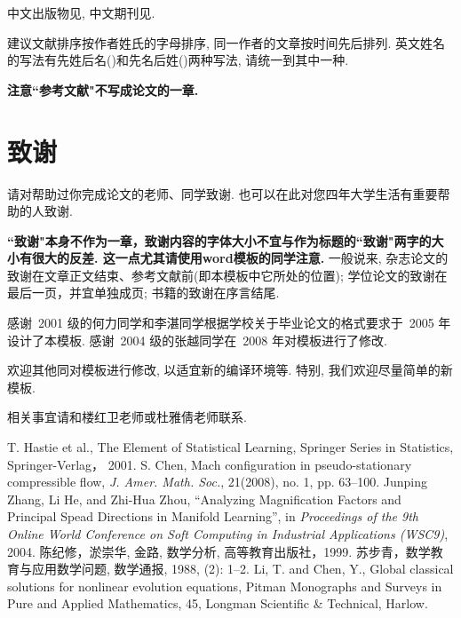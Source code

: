 \documentclass[notitlepage,cs4size,punct,oneside]{ctexrep}
\numberwithin{equation}{chapter}
\theoremstyle{mystyle}
\begin{document}
中文出版物见\cite{ChenJX}, 中文期刊见\cite{Su}.

建议文献排序按作者姓氏的字母排序, 同一作者的文章按时间先后排列.
英文姓名的写法有先姓后名(\cite{LiT})和先名后姓(\cite{ChenSX})两种写法,
请统一到其中一种.

\textbf{注意``参考文献"不写成论文的一章. }

\chapter*{\heiti 致谢}

请对帮助过你完成论文的老师、同学致谢. 也可以在此对您四年大学生活有重要帮助的人致谢.

\textbf{``致谢"本身不作为一章，致谢内容的字体大小不宜与作为标题的``致谢"两字的大小有很大的反差. 这一点尤其请使用word模板的同学注意. } 一般说来, 杂志论文的致谢在文章正文结束、参考文献前(即本模板中它所处的位置);  学位论文的致谢在最后一页，并宜单独成页; 书籍的致谢在序言结尾.

感谢~2001 级的何力同学和李湛同学根据学校关于毕业论文的格式要求于~2005 年设计了本模板.
感谢~2004 级的张越同学在~2008 年对模板进行了修改.

欢迎其他同对模板进行修改, 以适宜新的编译环境等. 特别, 我们欢迎尽量简单的新模板.

相关事宜请和楼红卫老师或杜雅倩老师联系.

 \footnotesize
\begin{thebibliography}{99}
 T. Hastie et al., The Element of Statistical
Learning, Springer Series in Statistics, Springer-Verlag， 2001.
 S. Chen, Mach configuration in pseudo-stationary compressible
flow, \emph{J. Amer. Math. Soc.}, 21(2008), no. 1, pp. 63--100.
 Junping Zhang, Li He, and Zhi-Hua Zhou, ``Analyzing Magnification Factors
and Principal Spead Directions in Manifold Learning'', in
\emph{Proceedings of the 9th Online World Conference on Soft
Computing in Industrial Applications (WSC9)}, 2004.
 陈纪修，淤崇华, 金路, 数学分析, 高等教育出版社，1999.
 苏步青，数学教育与应用数学问题, 数学通报, 1988, (2): 1--2.
 Li, T. and Chen, Y., Global classical solutions for nonlinear
evolution equations, Pitman Monographs and Surveys in Pure and
Applied Mathematics, 45, Longman Scientific \& Technical, Harlow.
\end{thebibliography}
\end{document}
